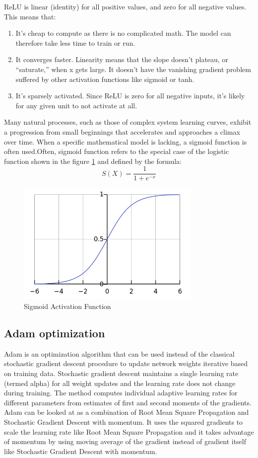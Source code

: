 \ac{ReLU} is linear (identity) for all positive values, and zero for all negative values. This means that:

\begin{enumerate}
		\item It’s cheap to compute as there is no complicated math. The model can therefore take less time to train or run.
		\item It converges faster. Linearity means that the slope doesn’t plateau, or “saturate,” when x gets large. It doesn’t have the vanishing gradient problem suffered by other activation functions like sigmoid or tanh.
		\item It’s sparsely activated. Since ReLU is zero for all negative inputs, it’s likely for any given unit to not activate at all.
\end{enumerate}
	
	Many natural processes, such as those of complex system learning curves, exhibit a progression from small beginnings that accelerates and approaches a climax over time. When a specific mathematical model is lacking, a sigmoid function is often used.Often, sigmoid function refers to the special case of the logistic function shown in the figure \ref{sigmoid} and defined by the formula:	
	\[S(X) = \frac{1}{1+e^{-x}}	\]

	\begin{figure}[tbh]
	\begin{center}
		\includegraphics[width = 3.5in]{images/sigmoid.png}
		\caption{Sigmoid Activation Function}
		\label{sigmoid}
	\end{center}
	\end{figure}
	
\subsection{Adam optimization}
Adam is an optimization algorithm that can be used instead of the classical stochastic gradient descent procedure to update network weights iterative based on training data. Stochastic gradient descent maintains a single learning rate (termed alpha) for all weight updates and the learning rate does not change during training. The method computes individual adaptive learning rates for different parameters from estimates of first and second moments of the gradients.
Adam can be looked at as a combination of Root Mean Square Propagation and Stochastic Gradient Descent with momentum. It uses the squared gradients to scale the learning rate like Root Mean Square Propagation and it takes advantage of momentum by using moving average of the gradient instead of gradient itself like Stochastic Gradient Descent with momentum.
